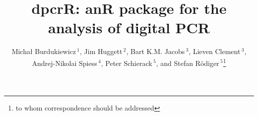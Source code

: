 \documentclass{bioinfo}
\begin{document}

\title[dpcR]{dpcrR: an\textbf{R} package for the analysis of digital PCR}
\author[Burdukiewicz \textit{et~al.}]{Micha\l{} Burdukiewicz\,$^{1}$, Jim Huggett\,$^2$, Bart K.M. Jacobs\,$^3$, Lieven Clement\,$^3$, Andrej-Nikolai Spiess\,$^4$, Peter Schierack\,$^5$, and Stefan R\"odiger\,$^{5}$\footnote{to whom correspondence should be addressed}}
\address{$^{1}$Department of Genomics, Faculty of Biotechnology, University of 
Wroc\l{}aw, Wroc\l{}aw, Poland\\
$^{2}$Molecular and Cell Biology Team, LGC, Teddington, United Kingdom\\
$^{3}$Department of Applied Mathematics, Computer Science and Statistics, Ghent University, Belgium\\
$^{4}$University Medical Center Hamburg-Eppendorf, Hamburg, Germany\\
$^{5}$Faculty of Natural Sciences, Brandenburg University of Technology 
Cottbus--Senftenberg, Germany}



\maketitle
\end{document}
